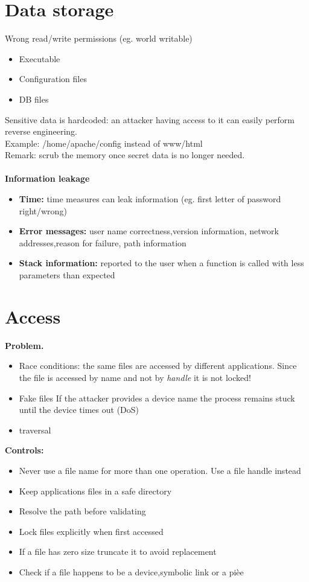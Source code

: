 \documentclass[10pt,a4paper]{article}
\begin{document}
\section{Data storage}
Wrong read/write permissions (eg. world writable)
\begin{itemize}
\item Executable
\item Configuration files
\item DB files
\end{itemize}
Sensitive data is hardcoded: an attacker having access to it can easily perform reverse engineering.\\
Example: /home/apache/config instead of www/html\\
Remark: scrub the memory once secret data is no longer needed.\\\\
\textbf{Information leakage}
\begin{itemize}
\item \textbf{Time:} time measures can leak information (eg. first letter of password right/wrong)
\item \textbf{Error messages:} user name correctness,version information, network addresses,reason for failure, path information
\item \textbf{Stack information:} reported to the user when a function is called with less parameters than expected
\end{itemize}
\section{Access}
\textbf{Problem.}
\begin{itemize}
\item Race conditions: the same files are accessed by different applications. Since the file is accessed by name and not by \emph{handle} it is not locked!
\item Fake files
If the attacker provides a device name the process remains stuck until the device times out (DoS)
\item traversal
\end{itemize}
\textbf{Controls:}
\begin{itemize}
\item Never use a file name for more than one operation. Use a file handle instead
\item Keep applications files in a safe directory
\item Resolve the path before validating
\item Lock files explicitly when first accessed
\item If a file has zero size truncate it to avoid replacement
\item Check if a file happens to be a device,symbolic link or a pièe
\end{itemize}
\end{document}

